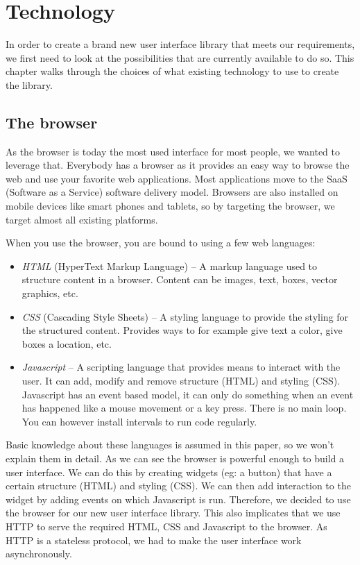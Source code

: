 \documentclass[11pt,a4paper]{article}
\begin{document}
\section{Technology}

In order to create a brand new user interface library that meets our requirements, we first need to look at the possibilities that are currently available to do so.
This chapter walks through the choices of what existing technology to use to create the library.

\subsection{The browser}

As the browser is today the most used interface for most people, we wanted to leverage that.
Everybody has a browser as it provides an easy way to browse the web and use your favorite web applications.
Most applications move to the SaaS (Software as a Service) software delivery model.
Browsers are also installed on mobile devices like smart phones and tablets, so by targeting the browser, we target almost all existing platforms.

When you use the browser, you are bound to using a few web languages:

\begin{itemize}
\item \textit{HTML} (HyperText Markup Language) -- A markup language used to structure content in a browser.
Content can be images, text, boxes, vector graphics, etc.
\item \textit{CSS} (Cascading Style Sheets) -- A styling language to provide the styling for the structured content.
Provides ways to for example give text a color, give boxes a location, etc.
\item \textit{Javascript} -- A scripting language that provides means to interact with the user.
It can add, modify and remove structure (HTML) and styling (CSS). Javascript has an event based model, it can only do something when an event has happened like a mouse movement or a key press.
There is no main loop.
You can however install intervals to run code regularly.
\end{itemize}

Basic knowledge about these languages is assumed in this paper, so we won't explain them in detail.
As we can see the browser is powerful enough to build a user interface.
We can do this by creating widgets (eg: a button) that have a certain structure (HTML) and styling (CSS).
We can then add interaction to the widget by adding events on which Javascript is run.
Therefore, we decided to use the browser for our new user interface library.
This also implicates that we use HTTP to serve the required HTML, CSS and Javascript to the browser.
As HTTP is a stateless protocol, we had to make the user interface work asynchronously.
\end{document}
